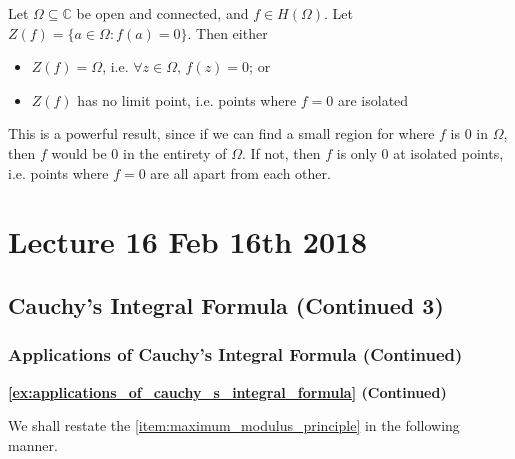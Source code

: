 \documentclass[notoc,notitlepage]{tufte-book}
\begin{document}
\begin{lemma}\label{lemma:principle_of_analytic_continuation}
	Let $\Omega \subseteq \mathbb{C}$ be open and connected, and $f \in H(\Omega)$. Let $Z(f) = \{a \in \Omega : f(a) = 0 \}$. Then either
	\begin{itemize}
		\item $Z(f) = \Omega$, i.e. $\forall z \in \Omega, \, f(z) = 0$; or
		\item $Z(f)$ has no limit point, i.e. points where $f = 0$ are isolated
	\end{itemize}
\end{lemma}

This is a powerful result, since if we can find a small region for where $f$ is $0$ in $\Omega$, then $f$ would be $0$ in the entirety of $\Omega$. If not, then $f$ is only $0$ at isolated points, i.e. points where $f = 0$ are all apart from each other.




\chapter{Lecture 16 Feb 16th 2018}
	\label{chapter:lecture_16_feb_16th_2018}

\section{Cauchy's Integral Formula (Continued 3)} %
\label{sec:cauchy_s_integral_formula_continued_3}

\subsection{Applications of Cauchy's Integral Formula (Continued)} %
\label{sub:applications_of_cauchy_s_integral_formula_continued}

\textbf{\cref{ex:applications_of_cauchy_s_integral_formula} (Continued)}

We shall restate the \cref{item:maximum_modulus_principle} in the following manner.
\end{document}
